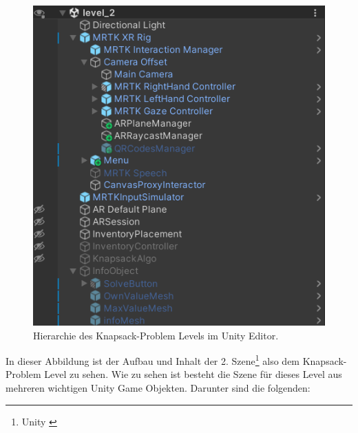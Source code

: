 \begin{figure}[h]
    \centering
    \includegraphics[scale=0.8]{images/Level2Hirarchy}
    \caption{Hierarchie des Knapsack-Problem Levels im Unity Editor.}
    \label{fig:level2_hierarchy}
\end{figure}

In dieser Abbildung ist der Aufbau und Inhalt der 2. Szene\footnote{Unity \cite{Scene}} also dem Knapsack-Problem Level
zu sehen. Wie zu sehen ist besteht die Szene für dieses Level aus mehreren wichtigen Unity Game Objekten. Darunter
sind die folgenden:

